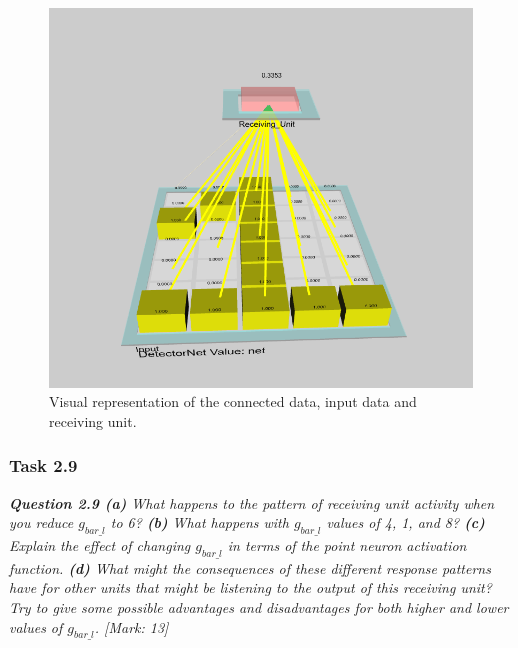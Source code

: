 \begin{figure}[H]
\centering
\includegraphics[scale=0.5]{Media/Main/EQ2/2.7-S1.png}
\caption{Visual representation of the connected data, input data and receiving unit.}
\label{Q2.7.1}
\end{figure}

\subsubsection{Task 2.9}
\label{Q1:Expl 2.6.3(2.9) SubSubSection}

\begin{tcolorbox}[colback=gray!20!white,colframe=gray!20!white]
  \emph{\textbf{Question 2.9 (a)} What happens to the pattern of receiving unit activity when you reduce $g_{bar\_l}$ to 6? \textbf{(b)} What happens with $g_{bar\_l}$ values of 4, 1, and 8? \textbf{(c)} Explain the effect of changing $g_{bar\_l}$ in terms of the point neuron activation function. \textbf{(d)} What might the consequences of these different response patterns have for other units that might be listening to the output of this receiving unit? Try to give some possible advantages and disadvantages for both higher and lower values of $g_{bar\_l}$. [Mark: 13]}
\end{tcolorbox} 
\vspace{0.5cm}

